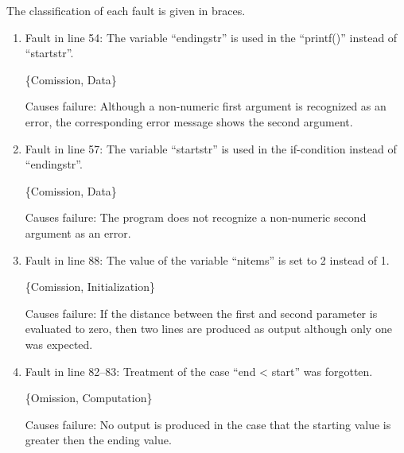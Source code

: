%
%

The classification of each fault is given in braces.

\begin{enumerate}

\item Fault in line 54: 
The variable ``endingstr'' is used in the ``printf()'' instead of
``startstr''.

\{Comission, Data\}

Causes failure:
Although a non-numeric first argument is recognized as an error, the
corresponding error message shows the second argument.


\item Fault in line 57: 
The variable ``startstr'' is used in the if-condition instead of
``endingstr''.

\{Comission, Data\}

Causes failure:
The program does not recognize a non-numeric second argument as an
error. 


\item Fault in line 88: 
The value of the variable ``nitems'' is set to 2 instead of 1.

\{Comission, Initialization\}

Causes failure:
If the distance between the first and second parameter is evaluated to
zero, then two lines are produced as output although only one was
expected.


\item Fault in line 82--83: 
Treatment of the case ``end < start'' was forgotten.

\{Omission, Computation\}

Causes failure:
No output is produced in the case that the starting value is greater
then the ending value.

\end{enumerate}

